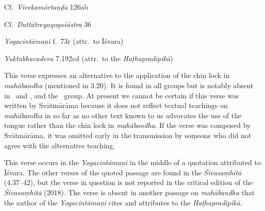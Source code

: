 \begin{ekdosis}
\begin{sources}[hp03_022]
Cf.~\emph{Vivekamārtaṇḍa} 126ab
\begin{versinnote}
\end{versinnote}
Cf.~\emph{Dattātreyayogaśāstra} 36
\begin{versinnote}
\end{versinnote}
\end{sources}

\begin{testimonia}[hp03_022]
\emph{Yogacintāmaṇi} f.~73r (attr.~to Īśvara)%
\begin{versinnote}
\end{versinnote}

\emph{Yuktabhavadeva} 7.192cd (attr.~to the \emph{Haṭhapradīpikā})
\begin{versinnote}
\end{versinnote}
\end{testimonia}

\begin{philcomm}[hp03_022]
This verse expresses an alternative to the application of the chin lock in \emph{mahā\-bandha} (mentioned in 3.20). It is found in all groups but is notably absent in \alphaOne\ and \alphaTwo, and the \textdelta\ group. At present we cannot be certain if this verse was written by Svātmārāma because it does not reflect textual teachings on \emph{mahābandha} in so far as no other text known to us advocates the use of the tongue rather than the chin lock in \emph{mahābandha}. If the verse was composed by Svātmārāma, it was omitted early in the transmission by someone who did not agree with the alternative teaching.\lb

This verse occurs in the \emph{Yogacintāmaṇi} in the middle of a quotation attributed to Īśvara. The other verses of the quoted passage are found in the \emph{Śivasaṃhitā} (4.37–42), but the verse in question is not reported in the critical edition of the \emph{Śivasaṃhitā} (2018). The verse is absent in another passage on \emph{mahābandha} that the author of the \emph{Yogacintāmaṇi} cites and attributes to the \emph{Haṭhapradīpikā}.\lb


\end{philcomm}
\end{ekdosis}
